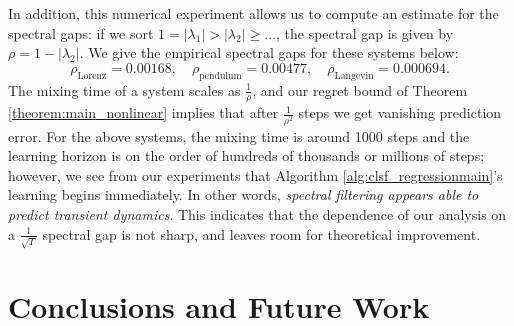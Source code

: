 \documentclass[11pt]{article}
\newcommand{\evannote}[1]{\textcolor{red}{\{evan: #1\}}}
\numberwithin{equation}{section}
\begin{document}


In addition, this numerical experiment allows us to compute an estimate for the spectral gaps: if we sort $1 = |\lambda_1| > |\lambda_2| \geq \ldots$, the spectral gap is given by $\rho = 1 - |\lambda_2|$. We give the empirical spectral gaps for these systems below:
$$\rho_{\text{Lorenz}} = 0.00168,\quad \rho_{\text{pendulum}} = 0.00477, \quad \rho_{\text{Langevin}} = 0.000694.$$
The mixing time of a system scales as $\frac{1}{\rho}$, and our regret bound of Theorem \ref{theorem:main_nonlinear} implies that after $\frac{1}{\rho^2}$ steps we get vanishing prediction error. For the above systems, the mixing time is around 1000 steps and the learning horizon is on the order of hundreds of thousands or millions of steps; however, we see from our experiments that Algorithm \ref{alg:clsf_regressionmain}'s learning begins immediately. In other words, \textit{spectral filtering appears able to predict transient dynamics}. This indicates that the dependence of our analysis on a $\frac{1}{\sqrt{T}}$ spectral gap is not sharp, and leaves room for theoretical improvement.



\section{Conclusions and Future Work}
\end{document}
